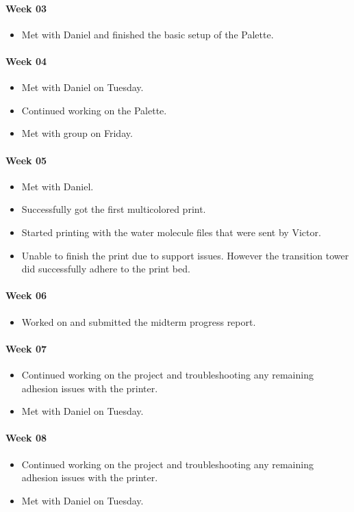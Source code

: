 \paragraph{Week 03}
\begin{itemize}
\item Met with Daniel and finished the basic setup of the Palette. 
\end{itemize}
\paragraph{Week 04}
\begin{itemize}
\item Met with Daniel on Tuesday.
\item Continued working on the Palette.
\item Met with group on Friday.
\end{itemize}
\paragraph{Week 05}
\begin{itemize}
\item Met with Daniel. 
\item Successfully got the first multicolored print. 
\item Started printing with the water molecule files that were sent by Victor. 
\item Unable to finish the print due to support issues. However the transition tower did successfully adhere to the print bed. 
\end{itemize}
\paragraph{Week 06}
\begin{itemize}
\item Worked on and submitted the midterm progress report. 
\end{itemize}
\paragraph{Week 07}
\begin{itemize}
\item Continued working on the project and troubleshooting any remaining adhesion issues with the printer. 
\item Met with Daniel on Tuesday.
\end{itemize}
\paragraph{Week 08}
\begin{itemize}
\item Continued working on the project and troubleshooting any remaining adhesion issues with the printer.
\item Met with Daniel on Tuesday.
\end{itemize}
